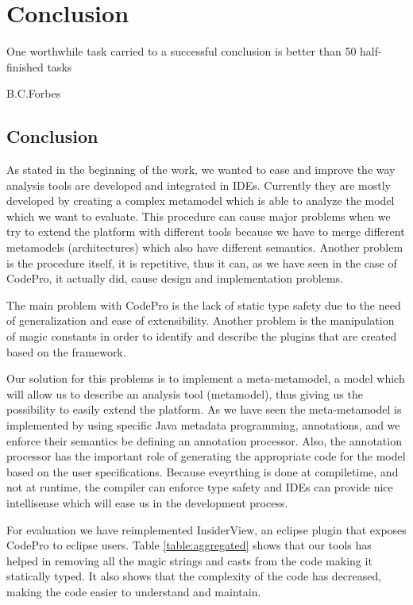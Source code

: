 \chapter{Conclusion}\label{ch:4}

\epigraph{One worthwhile task carried to a successful conclusion is better than
50 half-finished tasks }{B.C.Forbes}

\section{Conclusion}

	As stated in the beginning of the work, we wanted to ease and improve the way
analysis tools are developed and integrated in IDEs. Currently they are
mostly developed by creating a complex metamodel which is able to analyze the
model which we want to evaluate. This procedure can cause major problems when we
try to extend the platform with different tools because we have to merge
different metamodels (architectures) which also have different semantics.
Another problem is the procedure itself, it is repetitive, thus it can, as we
have seen in the case of CodePro, it actually did, cause design and
implementation problems.

	The main problem with CodePro is the lack of static type safety due to the
need of generalization and ease of extensibility. Another problem is the manipulation of
magic constants in order to identify and describe the plugins that are created
based on the framework. 

	Our solution for this problems is to implement a meta-metamodel, a model which
will allow us to describe an analysis tool (metamodel), thus  giving us
the possibility to easily extend the platform.
As we have seen the meta-metamodel is implemented by using specific Java metadata programming, annotations, and we
enforce their semantics be defining an annotation processor. Also, the
annotation processor has the important role of generating the appropriate code
for the model based on the user specifications. Because eveyrthing is done at
compiletime, and not at runtime, the compiler can enforce type safety and IDEs
can provide nice intellisense which will ease us in the development process.

	For evaluation we have reimplemented InsiderView, an eclipse plugin that
exposes CodePro to eclipse users. Table \ref{table:aggregated} shows that our
tools has helped in removing all the magic strings and casts from the code
making it statically typed. It also shows that the complexity of the code has
decreased, making the code easier to understand and maintain.
	
